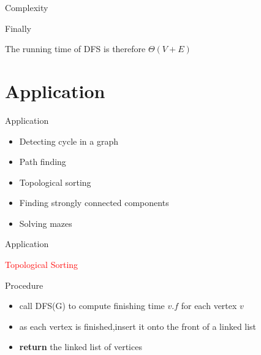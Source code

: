 \documentclass{beamer}
\begin{document}
    
    \begin{frame}{Complexity}
        \begin{block}{Finally}
        
        
            The running time of DFS is therefore $\Theta(V+E)$
        \end{block}  
    \end{frame}
    
    
    \section{Application}
    
    \begin{frame} {Application}
        
    
        \begin{itemize}
        \item Detecting cycle in a graph
        \item<2-> Path finding
        \item<3-> Topological sorting
        \item<4-> Finding strongly connected components
        \item <5-> Solving mazes
        \end{itemize}
    
    
        
    \end{frame}
    
    \begin{frame}{Application}
    
       \textcolor{red}{\Large Topological Sorting} \pause
       
       \vspace{5mm}
       
       Procedure 
       
        \begin{itemize}
        \item<2-> call DFS(G) to compute finishing time $v.f$ for each vertex $v$
        \item<3-> as each vertex is finished,insert it onto the front of a linked list
        \item<4-> \textbf{return} the linked list of vertices
        
        \end{itemize}
       
       
        
    \end{frame}
    
\end{document}
